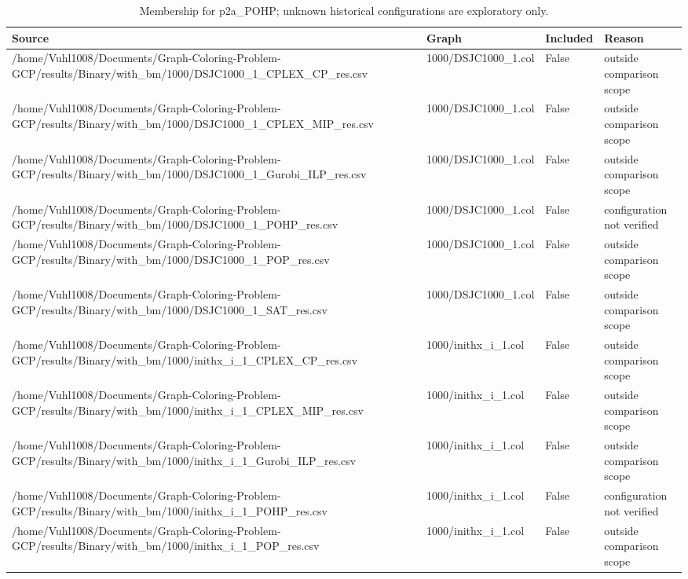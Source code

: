 \begin{table}[htbp]
\centering
\caption{Membership for p2a\_POHP; unknown historical configurations are exploratory only.}
\label{tab:p2a-POHP-membership}
\begin{tabular}{llll}
\hline
Source & Graph & Included & Reason \\
\hline
/home/Vuhl1008/Documents/Graph-Coloring-Problem-GCP/results/Binary/with\_bm/1000/DSJC1000\_1\_CPLEX\_CP\_res.csv & 1000/DSJC1000\_1.col & False & outside comparison scope \\
/home/Vuhl1008/Documents/Graph-Coloring-Problem-GCP/results/Binary/with\_bm/1000/DSJC1000\_1\_CPLEX\_MIP\_res.csv & 1000/DSJC1000\_1.col & False & outside comparison scope \\
/home/Vuhl1008/Documents/Graph-Coloring-Problem-GCP/results/Binary/with\_bm/1000/DSJC1000\_1\_Gurobi\_ILP\_res.csv & 1000/DSJC1000\_1.col & False & outside comparison scope \\
/home/Vuhl1008/Documents/Graph-Coloring-Problem-GCP/results/Binary/with\_bm/1000/DSJC1000\_1\_POHP\_res.csv & 1000/DSJC1000\_1.col & False & configuration not verified \\
/home/Vuhl1008/Documents/Graph-Coloring-Problem-GCP/results/Binary/with\_bm/1000/DSJC1000\_1\_POP\_res.csv & 1000/DSJC1000\_1.col & False & outside comparison scope \\
/home/Vuhl1008/Documents/Graph-Coloring-Problem-GCP/results/Binary/with\_bm/1000/DSJC1000\_1\_SAT\_res.csv & 1000/DSJC1000\_1.col & False & outside comparison scope \\
/home/Vuhl1008/Documents/Graph-Coloring-Problem-GCP/results/Binary/with\_bm/1000/inithx\_i\_1\_CPLEX\_CP\_res.csv & 1000/inithx\_i\_1.col & False & outside comparison scope \\
/home/Vuhl1008/Documents/Graph-Coloring-Problem-GCP/results/Binary/with\_bm/1000/inithx\_i\_1\_CPLEX\_MIP\_res.csv & 1000/inithx\_i\_1.col & False & outside comparison scope \\
/home/Vuhl1008/Documents/Graph-Coloring-Problem-GCP/results/Binary/with\_bm/1000/inithx\_i\_1\_Gurobi\_ILP\_res.csv & 1000/inithx\_i\_1.col & False & outside comparison scope \\
/home/Vuhl1008/Documents/Graph-Coloring-Problem-GCP/results/Binary/with\_bm/1000/inithx\_i\_1\_POHP\_res.csv & 1000/inithx\_i\_1.col & False & configuration not verified \\
/home/Vuhl1008/Documents/Graph-Coloring-Problem-GCP/results/Binary/with\_bm/1000/inithx\_i\_1\_POP\_res.csv & 1000/inithx\_i\_1.col & False & outside comparison scope \\

\end{tabular}
\end{table}
